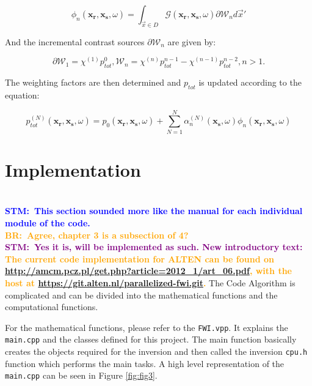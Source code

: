\documentclass[10pt,a4paper]{article}
\newcommand{\commentstm}[1]{\textcolor{blue}{\textbf{STM:\ #1}}}
\newcommand{\commentstmtwo}[1]{\textcolor{purple}{\textbf{STM:\ #1}}}
\newcommand{\newstmtwo}[1]{\textcolor{orange}{\textbf{#1}}}
\newcommand{\oldstmtwo}[1]{\xout{#1}}
\newcommand{\commentbr}[1]{\textcolor{orange}{\textbf{BR:\ #1}}}
\begin{document}
\begin{equation} \label{eq:eq30} \phi_n
(\mathbf{x_\text{r}},\mathbf{x_\text{s}},\omega) = \int_{\vec{x}\in D}
\mathcal{G} (\mathbf{x_\text{r}},\mathbf{x_\text{s}},\omega)\partial
\mathcal{W}_n d\vec{x}' \end{equation}

And the incremental contrast sources $\partial \mathcal{W}_n$ are given by:

\begin{equation} \label{eq:eq31} \partial \mathcal{W}_1 = \chi^{(1)}
p^{0}_{tot} , \mathcal{W}_n = \chi^{(n)} p^{n-1}_{tot} - \chi^{(n-1)}
p^{n-2}_{tot}, n > 1. \end{equation}

The weighting factors are then determined and $p_{tot}$ is updated
according to the equation:

\begin{equation} \label{eq:eq32} p^{(N)}_{tot}
(\mathbf{x_\text{r}},\mathbf{x_\text{s}},\omega) =  p_0
(\mathbf{x_\text{r}},\mathbf{x_\text{s}},\omega) + \sum\limits_{N=1}^N
\alpha^{(N)}_n (\mathbf{x_\text{s}},\omega) \phi_n
(\mathbf{x_\text{r}},\mathbf{x_\text{s}},\omega) \end{equation}



\section{Implementation}
\oldstmtwo{\textbf{4.Code Algorithm}}\\
\commentstm{This section sounded more like the manual for each
individual module of the code.}\\
\commentbr{Agree, chapter 3 is a subsection of 4?}\\
\commentstmtwo{Yes it is, will be implemented as such. New introductory text:}\\
\newstmtwo{The current code implementation for ALTEN can be found on
\url{http://amcm.pcz.pl/get.php?article=2012_1/art_06.pdf}, with the
host at \url{https://git.alten.nl/parallelized-fwi.git}.}
The Code Algorithm is complicated and can be divided into the
mathematical functions and the computational functions.

For the mathematical functions, please refer to the \texttt{FWI.vpp}.
It explains the \texttt{main.cpp} and the classes defined for this
project. The main function basically creates the objects required for
the inversion and then called the inversion \texttt{cpu.h} function
which performs the main tasks. A high level representation of the
\texttt{main.cpp} can be seen in Figure \ref{fig:fig3}.
\end{document}
